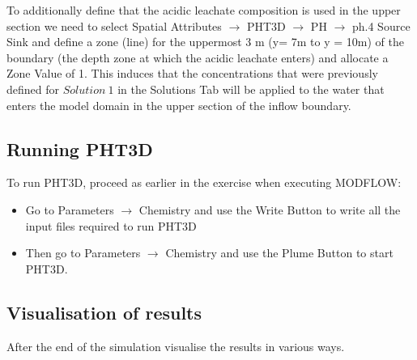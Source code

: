 \begin{itemize}
To additionally define that the acidic leachate composition is used in the upper section we need to 
select {\color{blue}Spatial Attributes} $\rightarrow$ {\color{blue}PHT3D} $\rightarrow$ {\color{blue}PH} $\rightarrow$ {\color{blue}ph.4 Source \/ Sink} and define a zone (line) for the uppermost 3 m (y= 7m to y = 10m)
of the boundary (the depth zone at which the acidic leachate enters) and allocate 
a {\color{blue}Zone Value} of 1. This induces that the concentrations that were previously defined 
for $Solution\ 1$ in the {\color{blue}Solutions} Tab will be applied to the water that enters 
the model domain in the upper section of the inflow boundary. 

\end{itemize}

\subsection[Running PHT3D]{Running PHT3D}

To run PHT3D, proceed as earlier in the exercise when executing MODFLOW:

\begin{itemize}

\item Go to {\color{blue}Parameters} $\rightarrow$ {\color{blue} Chemistry} and use 
the {\color{blue}Write Button} to write all the input files required to run PHT3D

\item Then go to {\color{blue}Parameters} $\rightarrow$ {\color{blue}Chemistry} and use the {\color{blue}Plume Button} to start PHT3D.

\end{itemize}

\subsection[Visualisation of results]{Visualisation of results}

After the end of the simulation visualise the results in various ways.

